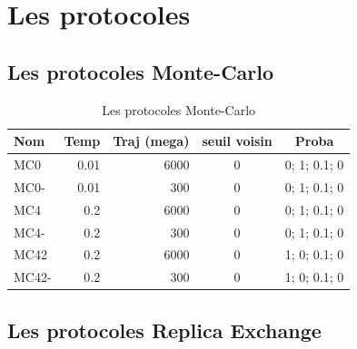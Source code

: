 \documentclass[a4paper,12pt]{article}
\begin{document}
\listoffigures
   \section{Les protocoles} 



   \subsection{Les protocoles Monte-Carlo} 
    
    \begin{table}[!htbp]
      \centering

      \begin{tabular}{|l|r|r|c|c|}

        \hline
        Nom & Temp & Traj (mega)& seuil voisin  & Proba \\
        \hline
        MC0   & 0.01  &  6000 & 0 & 0; 1; 0.1; 0   \\  
        MC0-  & 0.01  &   300 & 0 & 0; 1; 0.1; 0   \\  
        MC4   & 0.2   &  6000 & 0 & 0; 1; 0.1; 0   \\          
        MC4-  & 0.2   &   300 & 0 & 0; 1; 0.1; 0   \\ 
        MC42  & 0.2   &  6000 & 0 & 1; 0; 0.1; 0   \\        
        MC42- & 0.2   &   300 & 0 & 1; 0; 0.1; 0   \\   \hline                   

       
      \end{tabular}      
      \caption{Les protocoles Monte-Carlo}
      \label{tab_protoMC}      
    \end{table}

   \subsection{Les protocoles Replica Exchange} 
    
\end{document}
